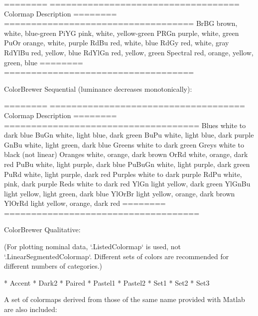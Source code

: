 \begin{DoxyVerb}
  ========  ===================================
  Colormap  Description
  ========  ===================================
  BrBG      brown, white, blue-green
  PiYG      pink, white, yellow-green
  PRGn      purple, white, green
  PuOr      orange, white, purple
  RdBu      red, white, blue
  RdGy      red, white, gray
  RdYlBu    red, yellow, blue
  RdYlGn    red, yellow, green
  Spectral  red, orange, yellow, green, blue
  ========  ===================================

ColorBrewer Sequential (luminance decreases monotonically):

  ========  ====================================
  Colormap  Description
  ========  ====================================
  Blues     white to dark blue
  BuGn      white, light blue, dark green
  BuPu      white, light blue, dark purple
  GnBu      white, light green, dark blue
  Greens    white to dark green
  Greys     white to black (not linear)
  Oranges   white, orange, dark brown
  OrRd      white, orange, dark red
  PuBu      white, light purple, dark blue
  PuBuGn    white, light purple, dark green
  PuRd      white, light purple, dark red
  Purples   white to dark purple
  RdPu      white, pink, dark purple
  Reds      white to dark red
  YlGn      light yellow, dark green
  YlGnBu    light yellow, light green, dark blue
  YlOrBr    light yellow, orange, dark brown
  YlOrRd    light yellow, orange, dark red
  ========  ====================================

ColorBrewer Qualitative:

(For plotting nominal data, `.ListedColormap` is used,
not `.LinearSegmentedColormap`.  Different sets of colors are
recommended for different numbers of categories.)

* Accent
* Dark2
* Paired
* Pastel1
* Pastel2
* Set1
* Set2
* Set3

A set of colormaps derived from those of the same name provided
with Matlab are also included:


\end{DoxyVerb}
